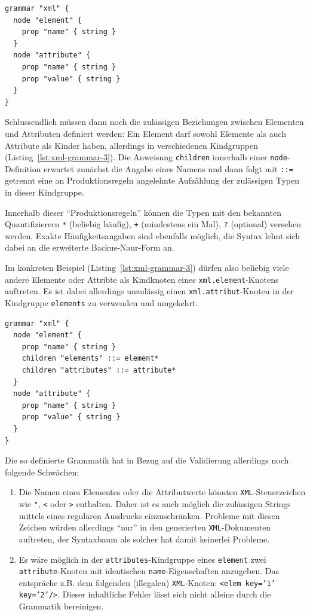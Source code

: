 \documentclass[paper=a4,fontsize=12pt,parskip=half]{scrartcl}
\begin{document}
\begin{lstlisting}[float=h, label={lst:xml-grammar-2},caption={\texttt{XML} Schritt 2 - Elemente mit Namen, Attribute mit Schlüssel-Wert-Paaren},captionpos=b,language={Grammar}]
grammar "xml" {
  node "element" {
    prop "name" { string }
  }
  node "attribute" {
    prop "name" { string }
    prop "value" { string }
  }
}
\end{lstlisting}

Schlussendlich müssen dann noch die zulässigen Beziehungen zwischen Elementen und Attributen definiert werden: Ein Element darf sowohl Elemente als auch Attribute als Kinder haben, allerdings in verschiedenen Kindgruppen (Listing~\ref{lst:xml-grammar-3}). Die Anweisung \texttt{children} innerhalb einer \texttt{node}-Definition erwartet zunächst die Angabe eines Namens und dann folgt mit \texttt{::=} getrennt eine an Produktionsregeln angelehnte Aufzählung der zulässigen Typen in dieser Kindgruppe.

Innerhalb dieser \enquote{Produktionsregeln} können die Typen mit den bekannten Quantifizierern \texttt{*} (beliebig häufig), \texttt{+} (mindestens ein Mal), \texttt{?} (optional) versehen werden. Exakte Häufigkeitsangaben sind ebenfalls möglich, die Syntax lehnt sich dabei an die erweiterte Backus-Naur-Form an.

Im konkreten Beispiel (Listing~\ref{lst:xml-grammar-3}) dürfen also beliebig viele andere Elemente oder Attribte als Kindknoten eines \texttt{xml.element}-Knotens auftreten. Es ist dabei allerdings unzulässig einen \texttt{xml.attribut}-Knoten in der Kindgruppe \texttt{elements} zu verwenden und umgekehrt.

\begin{lstlisting}[float=h, label={lst:xml-grammar-3},caption={\texttt{XML} Schritt 3 - Beziehungen zwischen Elementen und Attributen},captionpos=b,language={Grammar}]
grammar "xml" {
  node "element" {
    prop "name" { string }
    children "elements" ::= element*
    children "attributes" ::= attribute*
  }
  node "attribute" {
    prop "name" { string }
    prop "value" { string }
  }
}
\end{lstlisting}

Die so definierte Grammatik hat in Bezug auf die Validierung allerdings noch folgende Schwächen:

\begin{enumerate}
\item Die Namen eines Elementes oder die Attributwerte könnten \texttt{XML}-Steuerzeichen wie \texttt{"}, \texttt{<} oder \texttt{>} enthalten. Daher ist es auch möglich die zulässigen Strings mittels eines regulären Ausdrucks einzuschränken. Probleme mit diesen Zeichen würden allerdings \enquote{nur} in den generierten \texttt{XML}-Dokumenten auftreten, der Syntaxbaum als solcher hat damit keinerlei Probleme.
\item Es wäre möglich in der \texttt{attributes}-Kindgruppe eines \texttt{element} zwei \texttt{attribute}-Knoten mit identischen \texttt{name}-Eigenschaften anzugeben. Das entspräche z.B. dem folgenden (illegalen) \texttt{XML}-Knoten: \texttt{<elem key='1' key='2'/>}. Dieser inhaltliche Fehler lässt sich nicht alleine durch die Grammatik bereinigen.
\end{enumerate}
\end{document}
